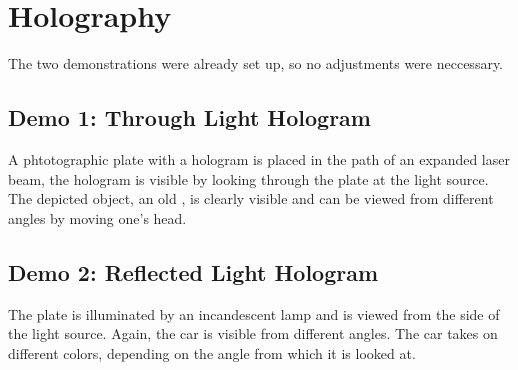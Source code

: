 \chapter{Holography}
The two demonstrations were already set up, so no adjustments were neccessary.

\section*{Demo 1: Through Light Hologram}
A phtotographic plate with a hologram is placed in the path of an expanded laser beam, the hologram is visible by looking through the plate at the light source.
The depicted object, an old , is clearly visible and can be viewed from different angles by moving one's head.

\section*{Demo 2: Reflected Light Hologram}
The plate is illuminated by an incandescent lamp and is viewed from the side of the light source.
Again, the car is visible from different angles.
The car takes on different colors, depending on the angle from which it is looked at.
